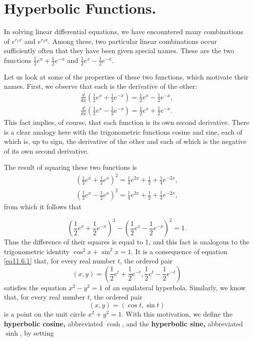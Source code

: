 \section{Hyperbolic Functions.} In solving linear differential equations, we have encountered many combinations of $e^{r_1x}$ and $e^{r_2x}$. Among these, two particular linear combinations occur sufficiently often that they have been given special names. These are the two functions $\frac{1}{2} e^x + \frac{1}{2} e^{-x}$ and $\frac{1}{2} e^x - \frac{1}{2} e^{-x}$.

Let us look at some of the properties of these two functions, which motivate their names. First, we observe that each is the derivative of the other:
\begin{eqnarray*}
       \frac{d}{dx} (\frac{1}{2} e^x + \frac{1}{2} e^{-x}) = \frac{1}{2} e^x - \frac{1}{2} e^{-x} ,\\
       \frac{d}{dx} (\frac{1}{2} e^x - \frac{1}{2} e^{-x}) = \frac{1}{2} e^x + \frac{1}{2} e^{-x} .
\end{eqnarray*}
This fact implies, of course, that each function is its own second derivative. There is a clear analogy here with the trigonometric functions cosine and sine, each of which is, up to sign, the derivative of the other and each of which is the negative of its own second derivative.

The result of squaring these two functions is
\begin{eqnarray*}
       (\frac{1}{2} e^x + \frac{1}{2} e^x)^2 = \frac{1}{4} e^{2x} + \frac{1}{2} + \frac{1}{4} e^{-2x},\\
       (\frac{1}{2} e^x - \frac{1}{2} e^x)^2 =  \frac{1}{4} e^{2x} + \frac{1}{2} + \frac{1}{4} e^{-2x},
\end{eqnarray*}
from which it follows that

\begin{equation}
       \label{eq11.6.1}
       (\frac{1}{2} e^x + \frac{1}{2} e^{-x})^2 - (\frac{1}{2} e^x - \frac{1}{2} e^{-x})^2 = 1.
\end{equation}
Thus the difference of their squares is equal to 1, and this fact is analogous to the trigonometric identity $\cos^2x + \sin^2x = 1$. It is a consequence of equation \ref{eq11.6.1} that, for every real number $t$, the ordered pair
$$
       (x,y) = (\frac{1}{2} e^t + \frac{1}{2} e^{-t}, \frac{1}{2} e^t - \frac{1}{2} e^{-t})
$$
satisfies the equation $x^2 - y^2 = 1$ of an equilateral hyperbola. Similarly, we know that, for every real number $t$, the ordered pair
$$
       (x, y) = (\cos t, \sin t)
$$
is a point on the unit circle $x^2 + y^2 = 1$. With this motivation, we define the \textbf{hyperbolic cosine,} abbreviated $\cosh$, and the \textbf{hyperbolic sine,} abbreviated $\sinh$, by setting

